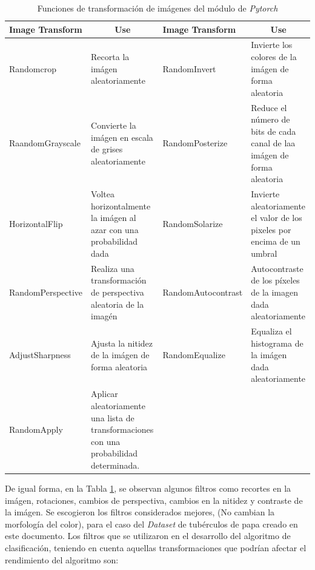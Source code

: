 \begin{table}[ht]
	\centering
	\begin{tabular}{|p{3.5cm}|p{3.5cm}|p{3.8cm}|p{3.5cm}|}
		\hline
		Image Transform       & \multicolumn{1}{c|}{Use}                                                               & Image Transform       & \multicolumn{1}{c|}{Use}                                                \\ \hline
		Randomcrop            & Recorta la imágen aleatoriamente                                                       & RandomInvert          & Invierte los colores de la imágen de forma aleatoria                    \\ \hline
		RaandomGrayscale      & Convierte la imágen en escala de grises aleatoriamente                                 & RandomPosterize       & Reduce el número de bits de cada canal de laa imágen de forma aleatoria \\ \hline
		HorizontalFlip  & Voltea horizontalmente la imágen al azar con una probabilidad dada                     & RandomSolarize        & Invierte aleatoriamente el valor de los pixeles por encima de un umbral \\ \hline
		RandomPerspective     & Realiza una transformación de perspectiva aleatoria de la imagén                       & RandomAutocontrast    & Autocontraste de los píxeles de la imagen dada aleatoriamente           \\ \hline
		AdjustSharpness & Ajusta la nitidez de la imágen de forma aleatoria                                      & RandomEqualize        & Equaliza el histograma de la imágen dada aleatoriamente                 \\ \hline
		RandomApply           & Aplicar aleatoriamente una lista de transformaciones con una probabilidad determinada. & \multicolumn{1}{l|}{} &                                                                         \\ \hline
	\end{tabular}				
	\caption{Funciones de transformación de imágenes del módulo de \textit{Pytorch}}
	\label{table:filters2}
\end{table}

\newpage
De igual forma, en la Tabla \ref{table:filters2}, se observan algunos filtros como recortes en la imágen, rotaciones, cambios de perspectiva, cambios en la nitidez y contraste de la imágen. Se escogieron los filtros considerados mejores, (No cambian la morfología del color), para el caso del \textit{Dataset} de tubérculos de papa creado en este documento. Los filtros que se utilizaron en el desarrollo del algoritmo de clasificación, teniendo en cuenta aquellas transformaciones que podrían afectar el rendimiento del algoritmo son:

